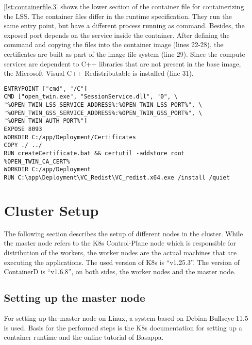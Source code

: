 \autoref{lst:containerfile.3} shows the lower section of the container file for containerizing the \ac{LSS}.
The container files differ in the runtime specification. They run the same entry point, but have a different process running as command. Besides, the exposed port depends on the service inside the container. 
After defining the command and copying the files into the container image (lines 22-28), the certificates are built as part of the image file system (line 29). Since the compute services are dependent to C++ libraries that are not present in the base image, the Microsoft Visual C++ Redistributable is installed (line 31).
\begin{lstlisting}[label=lst:containerfile.3, caption={Containerfile for the \ac{GSS}. Description of the command line and certificate creation. (\textit{Distribution/Container/session.Containerfile})}, language=docker, firstnumber=21]
ENTRYPOINT ["cmd", "/C"]
CMD ["open_twin.exe", "SessionService.dll", "0", \
"%OPEN_TWIN_LSS_SERVICE_ADDRESS%:%OPEN_TWIN_LSS_PORT%", \
"%OPEN_TWIN_GSS_SERVICE_ADDRESS%:%OPEN_TWIN_GSS_PORT%", \
"%OPEN_TWIN_AUTH_PORT%"]
EXPOSE 8093
WORKDIR C:/app/Deployment/Certificates
COPY ./ ../
RUN createCertificate.bat && certutil -addstore root %OPEN_TWIN_CA_CERT%
WORKDIR C:/app/Deployment
RUN C:\app\Deployment\VC_Redist\VC_redist.x64.exe /install /quiet
\end{lstlisting}



\section{Cluster Setup}
The following section describes the setup of different nodes in the cluster. While the master node refers to the \ac{K8s} Control-Plane node which is responsible for distribution of the workers, the worker nodes are the actual machines that are executing the applications.
The used version of \ac{K8s} is \enquote{v1.25.3}. The version of ContainerD is \enquote{v1.6.8}, on both sides, the worker nodes and the master node.

\subsection{Setting up the master node}
For setting up the master node on Linux, a system based on Debian Bullseye 11.5 is used. Basis for the performed steps is the \ac{K8s} documentation for setting up a container runtime\cite{Kubernetes.2019} and the online tutorial of Basappa\cite{Basappa.2022}.

